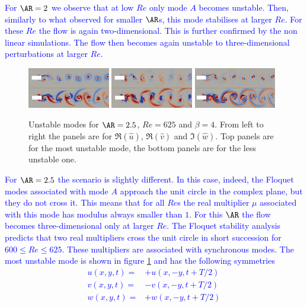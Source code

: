 \textcolor{blue}{
For $\AR=2$ we observe that at low $Re$ only mode $A$ becomes unstable. Then, similarly to what observed for smaller $\AR$s, this mode stabilises at larger $Re$. For these $Re$ the flow is again two-dimensional. This is further confirmed by the non linear simulations. The flow then becomes again unstable to three-dimensional perturbations at larger $Re$.
}
\begin{figure}
  \centering
  \includegraphics[width=0.32\textwidth]{./fig/AR2p5/u_Re625_beta4.png}
  \includegraphics[width=0.32\textwidth]{./fig/AR2p5/v_Re625_beta4.png}
  \includegraphics[width=0.32\textwidth]{./fig/AR2p5/w_Re625_beta4.png} 
  \caption{Unstable modes for $\AR=2.5$, $Re=625$ and $\beta=4$. From left to right the panels are for $\Re(\hat{u})$, $\Re(\hat{v})$ and $\Im(\hat{w})$. Top panels are for the most unstable mode, the bottom panels are for the less unstable one.}
  \label{fig:AR2p5modes}   
\end{figure}
\textcolor{blue}{
For $\AR=2.5$ the scenario is slightly different. In this case, indeed, the Floquet modes associated with mode $A$ approach the unit circle in the complex plane, but they do not cross it. This means that for all $Re$s the real multiplier $\mu$ associated with this mode has modulus always smaller than $1$. For this $\AR$ the flow becomes three-dimensional only at larger $Re$. The Floquet stability analysis predicts that two real multipliers cross the unit circle in short succession for $600 \le Re \le 625$. These multipliers are associated with synchronous modes.
The most unstable mode is shown in figure \ref{fig:AR2p5modes} and has the following symmetries
\begin{equation}
  \begin{aligned}
    u(x,y,t) = &+ u(x,-y,t+T/2) \\
    v(x,y,t) = &- v(x,-y,t+T/2) \\
    w(x,y,t) = &+ w(x,-y,t+T/2) 
  \end{aligned}
\end{equation}
}

